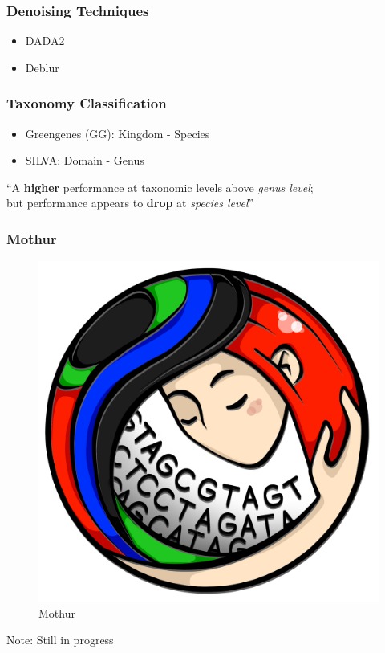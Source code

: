 \documentclass{beamer}
\begin{document}
    \begin{frame}
        \frametitle{Denoising Techniques}

        \begin{itemize}
            \item DADA2 \cite{DADA2}
            \item Deblur \cite{Deblur1}
        \end{itemize}
    \end{frame}

    \begin{frame}
        \frametitle{Taxonomy Classification}

        \begin{itemize}
            \item Greengenes (GG): Kingdom - Species \cite{greengenes1}
            \item SILVA: Domain - Genus \cite{silva1, silva2}
        \end{itemize}

        “A \textbf{higher} performance at taxonomic levels above \textit{genus level}; \\
        but performance appears to \textbf{drop} at \textit{species level}” \cite{performance1}
    \end{frame}

    \begin{frame}
        \frametitle{Mothur}

        \begin{figure}[h!]
            \includegraphics[width=0.3 \linewidth]{figures/mothur.png}
            \caption{Mothur}
        \end{figure}

        Note: Still in progress
    \end{frame}
\end{document}
